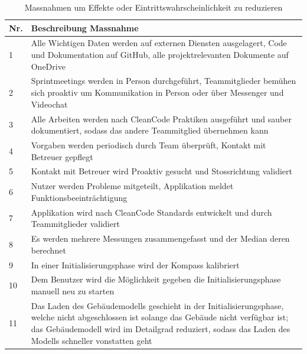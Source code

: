 \documentclass[a4paper]{scrreprt}
\begin{document}
\begin{table}[htb]
	\begin{tabularx}{\textwidth}{|l|X|}
		\hline
		\textbf{Nr.} & \textbf{Beschreibung Massnahme} \\
		\hline
		1 & Alle Wichtigen Daten werden auf externen Diensten ausgelagert, Code und Dokumentation auf GitHub, alle projektrelevanten Dokumente auf OneDrive\\
		\hline
		2 & Sprintmeetings werden in Person durchgeführt, Teammitglieder bemühen sich proaktiv um Kommunikation in Person oder über Messenger und Videochat\\
		\hline
		3 & Alle Arbeiten werden nach CleanCode Praktiken ausgeführt und sauber dokumentiert, sodass das andere Teammitglied übernehmen kann\\
		\hline
		4 & Vorgaben werden periodisch durch Team überprüft, Kontakt mit Betreuer gepflegt\\
		\hline
		5 & Kontakt mit Betreuer wird Proaktiv gesucht und Stossrichtung validiert\\
		\hline
		6 & Nutzer werden Probleme mitgeteilt, Applikation meldet Funktionsbeeinträchtigung\\
		\hline
		7 & Applikation wird nach CleanCode Standards entwickelt und durch Teammitglieder validiert\\
		\hline
		8 & Es werden mehrere Messungen zusammengefasst und der Median deren berechnet\\
		\hline
		9 & In einer Initialisierungsphase wird der Kompass kalibriert\\
		\hline
		10 & Dem Benutzer wird die Möglichkeit gegeben die Initialisierungsphase manuell neu zu starten\\
		\hline
		11 & Das Laden des Gebäudemodells geschieht in der Initialisierungsphase, welche nicht abgeschlossen ist solange das Gebäude nicht verfügbar ist; das Gebäudemodell wird im Detailgrad reduziert, sodass das Laden des Modells schneller vonstatten geht\\
		\hline
	\end{tabularx}
	\caption{Massnahmen um Effekte oder Eintrittswahrscheinlichkeit zu reduzieren}
\end{table}

\vspace{1em}
\end{document}
